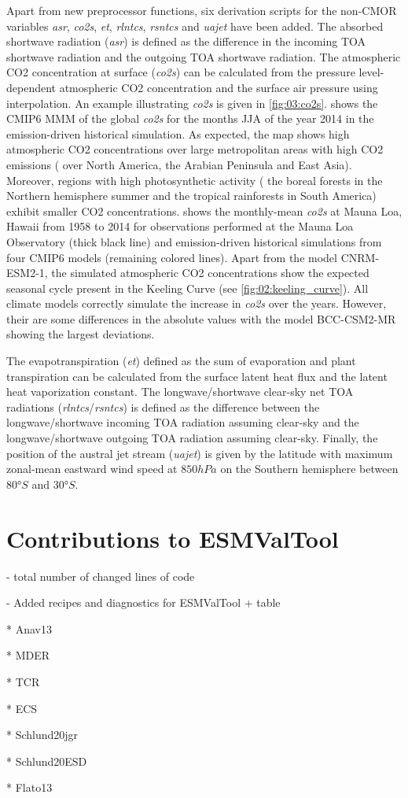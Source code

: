 Apart from new preprocessor functions, six derivation scripts for the
non-\ac{CMOR} variables \emph{asr}, \emph{co2s}, \emph{et}, \emph{rlntcs},
\emph{rsntcs} and \emph{uajet} have been added. The absorbed shortwave
radiation (\emph{asr}) is defined as the difference in the incoming \ac{TOA}
shortwave radiation and the outgoing \ac{TOA} shortwave radiation. The
atmospheric \ac{CO2} concentration at surface (\emph{co2s}) can be calculated
from the pressure level-dependent atmospheric \ac{CO2} concentration and the
surface air pressure using interpolation. An example illustrating \emph{co2s}
is given in \cref{fig:03:co2s}.  shows the \acs{CMIP}6
\ac{MMM} of the global \emph{co2s} for the months \acf{JJA} of the year 2014 in
the emission-driven historical simulation. As expected, the map shows high
atmospheric \ac{CO2} concentrations over large metropolitan areas with high
\ac{CO2} emissions (\eg{} over North America, the Arabian Peninsula and East
Asia). Moreover, regions with high photosynthetic activity (\eg{} the boreal
forests in the Northern hemisphere summer and the tropical rainforests in South
America) exhibit smaller \ac{CO2} concentrations.  shows
the monthly-mean \emph{co2s} at Mauna Loa, Hawaii from 1958 to 2014 for
observations performed at the Mauna Loa Observatory \autocite{Keeling2005}
(thick black line) and emission-driven historical simulations from four
\acs{CMIP}6 models (remaining colored lines). Apart from the model CNRM-ESM2-1,
the simulated atmospheric \ac{CO2} concentrations show the expected seasonal
cycle present in the Keeling Curve (see \cref{fig:02:keeling_curve}). All
climate models correctly simulate the increase in \emph{co2s} over the years.
However, their are some differences in the absolute values with the model
BCC-CSM2-MR showing the largest deviations.

The evapotranspiration (\emph{et}) defined as the sum of evaporation and plant
transpiration can be calculated from the surface latent heat flux and the
latent heat vaporization constant. The longwave/shortwave clear-sky net
\acf{TOA} radiations (\emph{rlntcs}/\emph{rsntcs}) is defined as the difference
between the longwave/shortwave incoming \ac{TOA} radiation assuming clear-sky
and the longwave/shortwave outgoing \ac{TOA} radiation assuming clear-sky.
Finally, the position of the austral jet stream (\emph{uajet}) is given by the
latitude with maximum zonal-mean eastward wind speed at $850 \unit{hPa}$ on the
Southern hemisphere between $80 \unit{\degree S}$ and $30 \unit{\degree S}$.


\section{Contributions to \acs{ESMValTool}}
\label{sec:03:contributions_to_esmvaltool}

- total number of changed lines of code

- Added recipes and diagnostics for ESMValTool + table

* Anav13

* MDER

* TCR

* ECS

* Schlund20jgr

* Schlund20ESD

* Flato13

